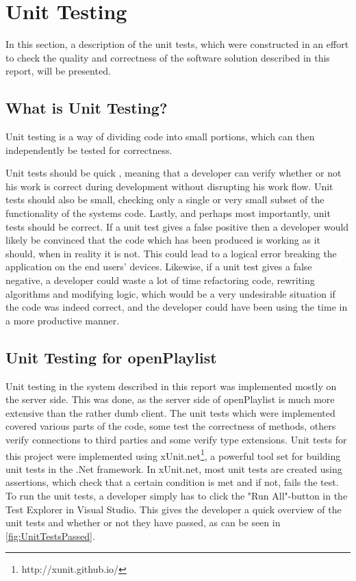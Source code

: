 \section{Unit Testing}
In this section, a description of the unit tests, which were constructed in an effort to check the quality and correctness of the software solution described in this report, will be presented.

\subsection{What is Unit Testing?}
Unit testing is a way of dividing code into small portions, which can then independently be tested for correctness\cite{unittesting}.

Unit tests should be quick , meaning that a developer can verify whether or not his work is correct during development without disrupting his work flow. Unit tests should also be small, checking only a single or very small subset of the functionality of the systems code. Lastly, and perhaps most importantly, unit tests should be correct. If a unit test gives a false positive then a developer would likely be convinced that the code which has been produced is working as it should, when in reality it is not. This could lead to a logical error breaking the application on the end users' devices.  Likewise, if a unit test gives a false negative, a developer could waste a lot of time refactoring code, rewriting algorithms and modifying logic, which would be a very undesirable situation if the code was indeed correct, and the developer could have been using the time in a more productive manner. 


\subsection{Unit Testing for openPlaylist}
Unit testing in the system described in this report was implemented mostly on the server side. This was done, as the server side of openPlaylist is much more extensive than the rather dumb client.
The unit tests which were implemented covered various parts of the code, some test the correctness of methods, others verify connections to third parties  and some verify type extensions.
Unit tests for this project were implemented using xUnit.net\footnote{http://xunit.github.io/}, a powerful tool set for building unit tests in the .Net framework. In xUnit.net, most unit tests are created using assertions, which check that a certain condition is met and if not, fails the test.
To run the unit tests, a developer simply has to click the "Run All"-button in the Test Explorer in Visual Studio. This gives the developer a quick overview of the unit tests and whether or not they have passed, as can be seen in \cref{fig:UnitTestsPassed}.

